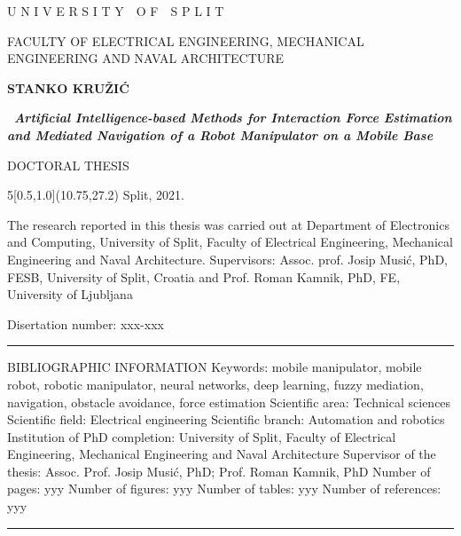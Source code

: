 \documentclass[12pt, twoside, onecolumn]{book}
\DeclareRobustCommand{\[}{\begin{equation}}
\DeclareRobustCommand{\]}{\end{equation}}
\begin{document}
\begin{titlepage}
\begin{center}
{\fontsize{13}{20}\textnormal{U N I V E R S I T Y~~O F~~S P L I T}}
	
{\fontsize{13}{20}\textnormal{FACULTY OF ELECTRICAL ENGINEERING, MECHANICAL ENGINEERING AND NAVAL ARCHITECTURE}}

\vskip 54mm
{\fontsize{14}{20}\bfseries{STANKO KRUŽIĆ}}

\vskip 18mm
{\fontsize{18}{18}\bfseries\
\emph{Artificial Intelligence-based Methods for Interaction Force Estimation and Mediated Navigation of a Robot Manipulator on a Mobile Base}}
	
\vskip 20mm
{\fontsize{14}{20}\textnormal{DOCTORAL THESIS}}

\begin{textblock}{5}[0.5,1.0](10.75,27.2)
{\fontsize{13}{20}\textnormal
Split, 2021.}
\end{textblock}

\end{center}
\newpage
		
\begin{flushleft}
\textnormal{}

The research reported in this thesis was carried out at Department of Electronics and Computing, University of Split, Faculty of Electrical Engineering, Mechanical Engineering and Naval Architecture.
\vskip 12mm
Supervisors: Assoc. prof. Josip Musić, PhD, FESB, University of Split, Croatia and Prof. Roman Kamnik, PhD, FE, University of Ljubljana

Disertation number: xxx-xxx

\vskip 40mm
\rule{16cm}{1.4pt}
\vskip 2mm
\addtolength{\leftskip}{5mm}\textnormal{BIBLIOGRAPHIC INFORMATION}
\vskip 2mm
\textnormal{Keywords: mobile manipulator, mobile robot, robotic manipulator, neural networks, deep learning, fuzzy mediation, navigation, obstacle avoidance, force estimation}
\vskip 0mm
\textnormal{Scientific area: Technical sciences}
\vskip 0mm
\textnormal{Scientific field: Electrical engineering}
\vskip 0mm
\textnormal{Scientific branch: Automation and robotics}
\vskip 0mm
\textnormal{Institution of PhD completion: University of Split, Faculty of Electrical Engineering, Mechanical Engineering and Naval Architecture}
\vskip 0mm
\textnormal{Supervisor of the thesis: Assoc. Prof. Josip Musić, PhD; Prof. Roman Kamnik, PhD}
\vskip 0mm
\textnormal{Number of pages: yyy}
\vskip 0mm
\textnormal{Number of figures: yyy}
\vskip 0mm
\textnormal{Number of tables: yyy}
\vskip 0mm
\textnormal{Number of references: yyy}
\vskip 0mm
\rule{16cm}{1.4pt}
\addtolength{\leftskip}{-5mm}


\end{flushleft}
\end{titlepage}
\end{document}
